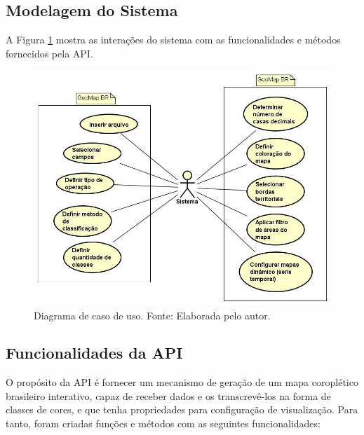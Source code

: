 \documentclass[12pt]{article}
\begin{document}
\subsection{Modelagem do Sistema}

A Figura \ref{casosdeuso} mostra as interações do sistema com as funcionalidades e métodos fornecidos pela API.

\begin{figure}[!h]
\centering
\includegraphics[scale=0.51]{casosdeuso.jpg}
\caption{Diagrama de caso de uso. Fonte: Elaborada pelo autor.}
\label{casosdeuso}
\end{figure}

\subsection{Funcionalidades da API}

O propósito da API é fornecer um mecanismo de geração de um mapa coroplético brasileiro interativo, capaz de receber dados e os transcrevê-los na forma de classes de cores, e que tenha propriedades para configuração de visualização. Para tanto, foram criadas funções e métodos com as seguintes funcionalidades:
\end{document}
